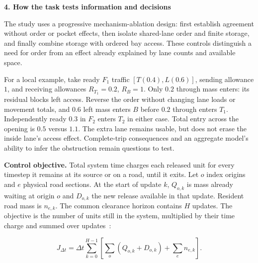 \documentclass[10pt,a4paper]{article}
\newenvironment{revision}{\begingroup\color{revisionred}}{\par\endgroup}
\newcommand{\head}[1]{\par\vspace{4pt}\noindent\textbf{#1}\par\nobreak\vspace{1pt}}
\begin{document}
\begin{revision}
\head{4. How the task tests information and decisions}
The study uses a progressive mechanism-ablation design: first establish
agreement without order or pocket effects, then isolate shared-lane order
and finite storage, and finally combine storage with ordered bay access.
These controls distinguish a need for order from an effect already
explained by lane counts and available space.

For a local example, take ready $F_1$ traffic $[T(0.4),L(0.6)]$, sending
allowance $1$, and receiving allowances $R_{T_1}=0.2$, $R_B=1$.
Only $0.2$ through mass enters: its residual blocks left access. Reverse
the order without changing lane loads or movement totals, and $0.6$
left mass enters $B$ before $0.2$ through enters $T_1$. Independently
ready $0.3$ in $F_2$ enters $T_2$ in either case. Total entry across the
opening is $0.5$ versus $1.1$. The extra lane remains usable, but does
not erase the inside lane's access effect. Complete-trip consequences
and an aggregate model's ability to infer the obstruction remain questions
to test.

\textbf{Control objective.} Total system time charges each released unit
for every timestep it remains at its source or on a road, until it exits.
Let $o$ index origins and $e$ physical road sections. At the start of
update $k$, $Q_{o,k}$ is mass already waiting at origin $o$ and
$D_{o,k}$ the new release available in that update. Resident road mass is
$n_{e,k}$. The common clearance horizon contains $H$ updates. The objective
is the number of units still in the system, multiplied by their time
charge and summed over updates~\cite{m0}:
\end{revision}
\begin{equation}
 J_{\Delta t}
 =\Delta t\sum_{k=0}^{H-1}
 \left[\sum_o(Q_{o,k}+D_{o,k})+\sum_en_{e,k}\right].
 \label{eq:compact-tst}
\end{equation}
\end{document}
